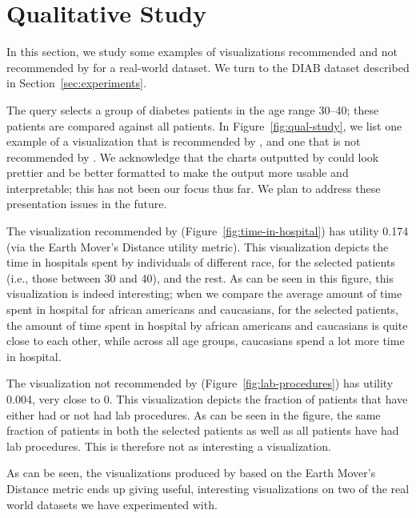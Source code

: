 
\section{Qualitative Study}\label{sec:example-viz}

In this section, we study some examples of visualizations recommended and
not recommended by \VizRecDB for a real-world dataset.
We turn to the DIAB dataset described in 
Section~\ref{sec:experiments}.
 
The query selects a group of diabetes patients in the age range 30--40;
these patients are compared against all patients.
In Figure~\ref{fig:qual-study}, we list one example of a visualization
that is recommended by \VizRecDB, and one that is not recommended by \VizRecDB.
We acknowledge that the charts outputted by \VizRecDB could look prettier and be better
formatted to make the output more usable and interpretable; this has not been our focus thus far. 
We plan to address these presentation issues in the future.

The visualization recommended by \VizRecDB (Figure~\ref{fig:time-in-hospital}) has utility 0.174 (via
the Earth Mover's Distance utility metric).
This visualization depicts the time in hospitals spent by
individuals of different race, for the selected patients
(i.e., those between 30 and 40), and
the rest. 
As can be seen in this figure, this visualization is indeed interesting;
when we compare the average amount of time spent in hospital 
for african americans and caucasians, 
for the selected patients, the amount of time spent in hospital
by african americans and caucasians is quite close to each other,
while across all age groups, caucasians spend a lot more time
in hospital.

The visualization not recommended by \VizRecDB (Figure~\ref{fig:lab-procedures}) has utility 0.004, very close to 0.
This visualization depicts the fraction of patients that 
have either had or not had lab procedures. 
As can be seen in the figure, the same fraction of patients in
both the selected patients as well as all patients
have had lab procedures.
This is therefore not as interesting a visualization.

As can be seen, 
the visualizations produced by \VizRecDB based on the Earth Mover's Distance
metric ends up giving useful, interesting visualizations on two of
the real world datasets we have experimented with.



